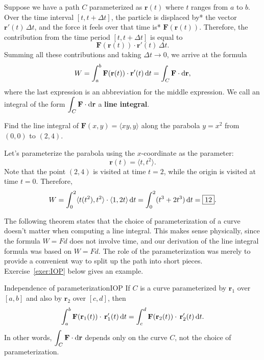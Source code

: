 \documentclass[prettycode,shellescape]{watsonbook}
\begin{document}
Suppose we have a path $C$ parameterized as $\mathbf{r}(t)$ where $t$
ranges from $a$ to $b$. Over the time interval $[t,t+\Delta t]$, the
particle is displaced by* the vector $\mathbf{r}'(t) \, \Delta t$, and
the force it feels over that time is* $\mathbf{F}(\mathbf{r}(t))$.
Therefore, the contribution from the time period $[t, t+\Delta t]$ is
equal to 
\[
  \mathbf{F}(\mathbf{r}(t)) \cdot \mathbf{r}'(t) \, \Delta t. 
\]
Summing all these contributions and taking $\Delta t \to 0$, we arrive
at the formula
\[
  W = \int_a^b \mathbf{F}(\mathbf{r}(t)) \cdot \mathbf{r}'(t) \, {\mathrm{d}}t =
  \int_C \mathbf{F} \cdot \mathrm{d}\mathbf{r}, 
\]
where the last expression is an abbreviation for the middle
expression. We call an integral of the form $\displaystyle{\int_C \mathbf{F} \cdot
  \mathrm{d}\mathbf{r}}$ a \textbf{line integral}. 

\begin{example}{}{}
  Find the line integral of $\mathbf{F}(x,y) = \langle xy, y \rangle$
  along the parabola $y = x^2$ from 
  $(0,0)$ to $(2,4)$. 
\end{example}

\begin{solution}
  Let's parameterize the parabola using the $x$-coordinate as the
  parameter:
  \[
    \mathbf{r}(t) = \langle t, t^2 \rangle. 
  \]
  Note that the point $(2,4)$ is visited at time $t=2$, while the
  origin is visited at time $t=0$. Therefore, 
  \[
    W = \int_0^2 \langle t(t^2), t^2 \rangle \cdot \langle 1, 2t \rangle
    \, {\mathrm{d}}t = \int_0^2 (t^3 + 2t^3) \, {\mathrm{d}}t = \boxed{12}. 
  \]
\end{solution}

The following theorem states that the choice of parameterization of a
curve doesn't matter when computing a line integral. This makes sense
physically, since the formula $W = Fd$ does not involve time, and our
derivation of the line integral formula was based on $W=Fd$. The role
of the parameterization was merely to provide a convenient way to
split up the path into short pieces. Exercise~\ref{exer:IOP} below
gives an example.

\begin{theo}{Independence of parameterization}{IOP}
  If $C$ is a curve parameterized by $\mathbf{r}_1$ over $[a,b]$ and
  also by $\mathbf{r}_2$ over $[c,d]$, then
  \[
    \int_a^b\mathbf{F}(\mathbf{r}_1(t))  \cdot \,
    \mathbf{r}'_1(t) \, {\mathrm{d}}t =
    \int_c^d \mathbf{F}(\mathbf{r}_2(t))  \cdot \,
    \mathbf{r}'_2(t) \, {\mathrm{d}}t. 
  \]
  In other words,
  $\displaystyle{\int_C \mathbf{F} \cdot \mathrm{d}\mathbf{r}}$ depends only
  on the curve $C$, not the choice of parameterization.
\end{theo}
\end{document}
